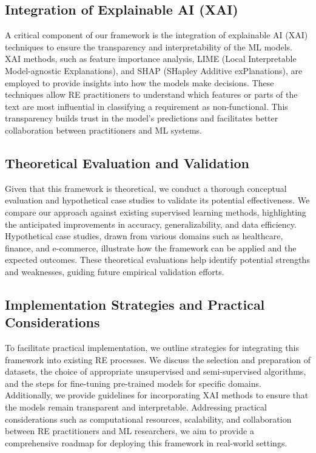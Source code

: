 \documentclass[sigconf,natbib=false]{acmart}
\begin{document}
\subsection{Integration of Explainable AI (XAI)}
A critical component of our framework is the integration of explainable AI (XAI) techniques to ensure the transparency and interpretability of the ML models. XAI methods, such as feature importance analysis, LIME (Local Interpretable Model-agnostic Explanations), and SHAP (SHapley Additive exPlanations), are employed to provide insights into how the models make decisions. These techniques allow RE practitioners to understand which features or parts of the text are most influential in classifying a requirement as non-functional. This transparency builds trust in the model’s predictions and facilitates better collaboration between practitioners and ML systems.

\subsection{Theoretical Evaluation and Validation}
Given that this framework is theoretical, we conduct a thorough conceptual evaluation and hypothetical case studies to validate its potential effectiveness. We compare our approach against existing supervised learning methods, highlighting the anticipated improvements in accuracy, generalizability, and data efficiency. Hypothetical case studies, drawn from various domains such as healthcare, finance, and e-commerce, illustrate how the framework can be applied and the expected outcomes. These theoretical evaluations help identify potential strengths and weaknesses, guiding future empirical validation efforts.

\subsection{Implementation Strategies and Practical Considerations}
To facilitate practical implementation, we outline strategies for integrating this framework into existing RE processes. We discuss the selection and preparation of datasets, the choice of appropriate unsupervised and semi-supervised algorithms, and the steps for fine-tuning pre-trained models for specific domains. Additionally, we provide guidelines for incorporating XAI methods to ensure that the models remain transparent and interpretable. Addressing practical considerations such as computational resources, scalability, and collaboration between RE practitioners and ML researchers, we aim to provide a comprehensive roadmap for deploying this framework in real-world settings.
\end{document}
